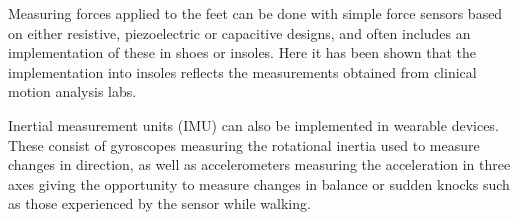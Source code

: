 Measuring forces applied to the feet can be done with simple force sensors based on either resistive, piezoelectric or capacitive designs, and often includes an implementation of these in shoes or insoles. Here it has been shown that the implementation into insoles reflects the measurements obtained from clinical motion analysis labs. \cite{Muro2014}

Inertial measurement units (IMU) can also be implemented in wearable devices. These consist of gyroscopes measuring the rotational inertia used to measure changes in direction, as well as accelerometers measuring the acceleration in three axes giving the opportunity to measure changes in balance or sudden knocks such as those experienced by the sensor while walking. \cite{Muro2014}








